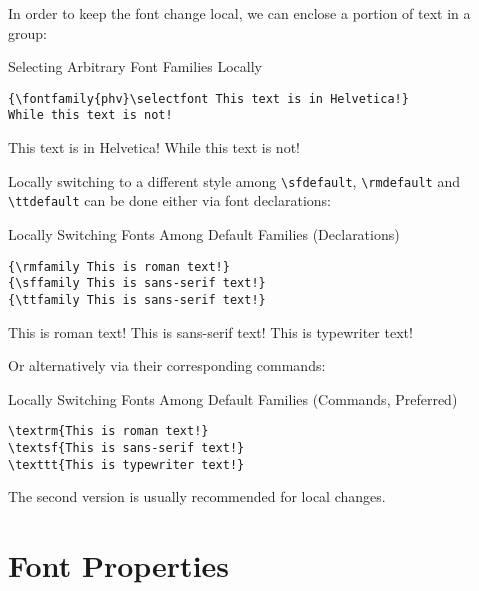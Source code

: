 \documentclass[a4paper,oneside,11pt]{article}
\newcommand\comm[1]{\texttt{\textbackslash#1}}
\begin{document}
In order to keep the font change local,  we can enclose a portion of text in a
group:

\begin{titled-frame}
{\textsf{Selecting Arbitrary Font Families Locally}}
\vspace{-1em}
\begin{verbatim}
{\fontfamily{phv}\selectfont This text is in Helvetica!}
While this text is not!
\end{verbatim}
{\selectfont This text is in Helvetica!} While this text is not!
\end{titled-frame}

Locally   switching    to   a   different   style    among   \comm{sfdefault},
\comm{rmdefault}   and  \comm{ttdefault}   can   be  done   either  via   font
declarations:

\begin{titled-frame}
{\textsf{Locally Switching Fonts Among Default Families (Declarations)}}
\vspace{-1em}
\begin{verbatim}
{\rmfamily This is roman text!}
{\sffamily This is sans-serif text!}
{\ttfamily This is sans-serif text!}
\end{verbatim}
{\rmfamily This is roman text!}
{\sffamily This is sans-serif text!}
{\ttfamily This is typewriter text!}
\end{titled-frame}

Or alternatively via their corresponding commands:

\begin{titled-frame}
{\textsf{Locally Switching Fonts Among Default Families (Commands, Preferred)}}
\vspace{-1em}
\begin{verbatim}
\textrm{This is roman text!}
\textsf{This is sans-serif text!}
\texttt{This is typewriter text!}
\end{verbatim}
\vspace{-1em}
\end{titled-frame}

The second version is usually recommended for local changes.


\section{Font Properties}
\label{sec:font-props}
\end{document}
